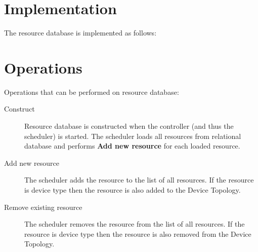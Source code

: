 
     


\section{Implementation}

The resource database is implemented as follows:


\section{Operations}

Operations that can be performed on resource database:

\begin{description}
\item[Construct]
Resource database is constructed when the controller (and thus the scheduler) 
is started. The scheduler loads all resources from relational database and 
performs \textbf{Add new resource} for each loaded resource.

\item[Add new resource]
The scheduler adds the resource to the list of all resources. If the resource 
is device type then the resource is also added to the Device Topology.

\item[Remove existing resource]
The scheduler removes the resource from the list of all resources. If the 
resource is device type then the resource is also removed from the Device 
Topology.
\end{description} 
